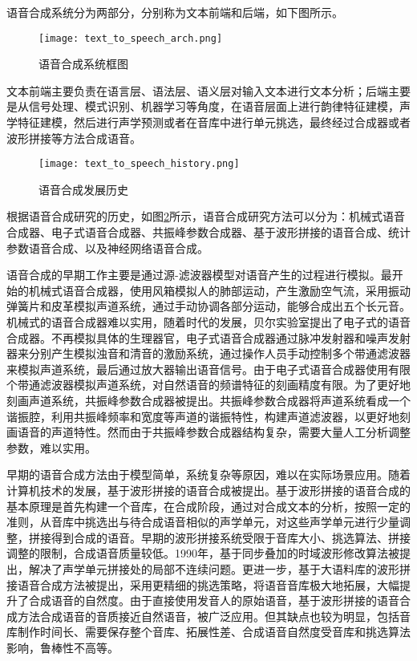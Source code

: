 \documentclass[cn,10pt,math=newtx,citestyle=gb7714-2015,bibstyle=gb7714-2015]{elegantbook}
\begin{document}
  语音合成系统分为两部分，分别称为文本前端和后端，如下图所示。

  \begin{figure}[htbp]
    \centering
    \texttt{[image: text\_to\_speech\_arch.png]}
    \caption{语音合成系统框图 \label{fig:text_to_speech_arch}}
  \end{figure}

  文本前端主要负责在语言层、语法层、语义层对输入文本进行文本分析；后端主要是从信号处理、模式识别、机器学习等角度，在语音层面上进行韵律特征建模，声学特征建模，然后进行声学预测或者在音库中进行单元挑选，最终经过合成器或者波形拼接等方法合成语音。

  \begin{figure}[htbp]
    \centering
    \texttt{[image: text\_to\_speech\_history.png]}
    \caption{语音合成发展历史 \label{fig:text_to_speech_history}}
  \end{figure}

  根据语音合成研究的历史，如图\ref{fig:text_to_speech_history}所示，语音合成研究方法可以分为：机械式语音合成器、电子式语音合成器、共振峰参数合成器、基于波形拼接的语音合成、统计参数语音合成、以及神经网络语音合成。

  语音合成的早期工作主要是通过源-滤波器模型对语音产生的过程进行模拟。最开始的机械式语音合成器，使用风箱模拟人的肺部运动，产生激励空气流，采用振动弹簧片和皮革模拟声道系统，通过手动协调各部分运动，能够合成出五个长元音。机械式的语音合成器难以实用，随着时代的发展，贝尔实验室提出了电子式的语音合成器。不再模拟具体的生理器官，电子式语音合成器通过脉冲发射器和噪声发射器来分别产生模拟浊音和清音的激励系统，通过操作人员手动控制多个带通滤波器来模拟声道系统，最后通过放大器输出语音信号。由于电子式语音合成器使用有限个带通滤波器模拟声道系统，对自然语音的频谱特征的刻画精度有限。为了更好地刻画声道系统，共振峰参数合成器被提出。共振峰参数合成器将声道系统看成一个谐振腔，利用共振峰频率和宽度等声道的谐振特性，构建声道滤波器，以更好地刻画语音的声道特性。然而由于共振峰参数合成器结构复杂，需要大量人工分析调整参数，难以实用。

  早期的语音合成方法由于模型简单，系统复杂等原因，难以在实际场景应用。随着计算机技术的发展，基于波形拼接的语音合成被提出。基于波形拼接的语音合成的基本原理是首先构建一个音库，在合成阶段，通过对合成文本的分析，按照一定的准则，从音库中挑选出与待合成语音相似的声学单元，对这些声学单元进行少量调整，拼接得到合成的语音。早期的波形拼接系统受限于音库大小、挑选算法、拼接调整的限制，合成语音质量较低。1990年，基于同步叠加的时域波形修改算法被提出，解决了声学单元拼接处的局部不连续问题。更进一步，基于大语料库的波形拼接语音合成方法被提出，采用更精细的挑选策略，将语音音库极大地拓展，大幅提升了合成语音的自然度。由于直接使用发音人的原始语音，基于波形拼接的语音合成方法合成语音的音质接近自然语音，被广泛应用。但其缺点也较为明显，包括音库制作时间长、需要保存整个音库、拓展性差、合成语音自然度受音库和挑选算法影响，鲁棒性不高等。
\end{document}
